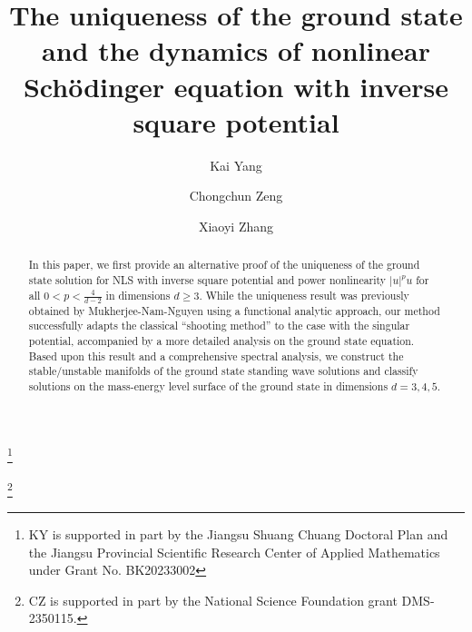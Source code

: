 \documentclass[12pt]{amsart}
\begin{document}
\title{The uniqueness of the ground state and the dynamics of nonlinear Sch\"odinger equation with inverse square potential}
\author[K. Yang]{Kai Yang}
\address[Kai Yang]{School of Mathematics, Southeast University, Nanjing, P.R. China 211189}
\thanks{KY is supported in part by the Jiangsu Shuang Chuang Doctoral Plan and the Jiangsu Provincial Scientific Research Center of Applied Mathematics under Grant No. BK20233002}


\author[C. Zeng]{Chongchun Zeng}
\address[Chongchun Zeng]{School of Mathematics, Georgia Institute of Technology, Atlanta, GA 30332}
\thanks{CZ is supported in part by the National  Science Foundation grant  DMS-2350115.} 

\author[X. Zhang]{Xiaoyi Zhang}
\address[Xiaoyi Zhang]{Department of Mathematics, University of Iowa, Iowa City, IA 52242}
\maketitle

\begin{abstract}
In this paper, we first provide an alternative proof of the uniqueness of the ground state solution for NLS with inverse square potential and power nonlinearity $|u|^pu$ for all $0<p<\frac 4{d-2}$ in dimensions $d\ge 3$. While the uniqueness result was previously obtained by Mukherjee-Nam-Nguyen using a functional analytic approach, our method successfully adapts the classical ``shooting method'' to the case with the singular potential, accompanied by a more detailed analysis on the ground state equation. Based upon this result and a comprehensive spectral analysis, we construct the stable/unstable manifolds of the ground state standing wave solutions and classify solutions on the mass-energy level surface of the ground state in dimensions $d=3, 4, 5$. 

\end{abstract}



\end{document}
